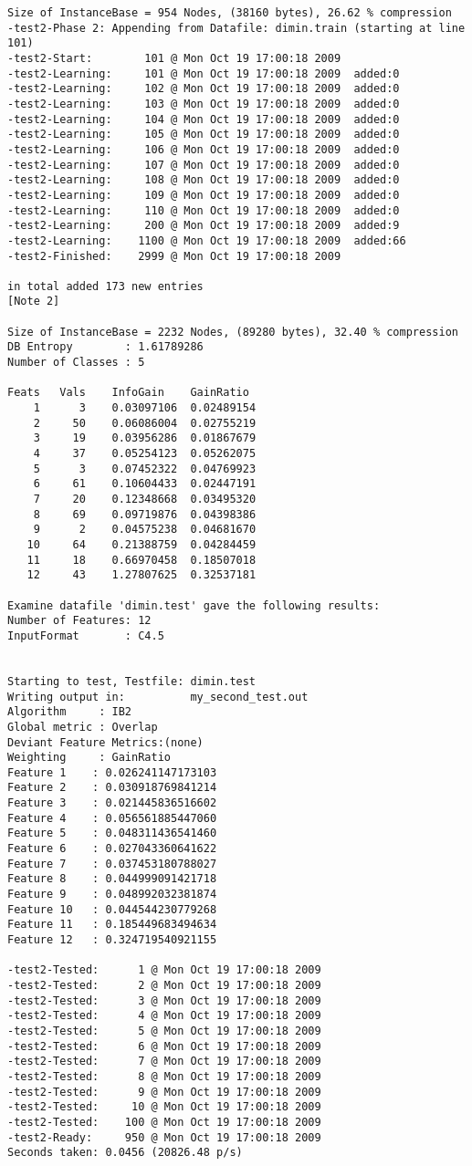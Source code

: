 \documentclass{report}
\begin{document}
\begin{footnotesize}
\begin{verbatim}
Size of InstanceBase = 954 Nodes, (38160 bytes), 26.62 % compression
-test2-Phase 2: Appending from Datafile: dimin.train (starting at line 101)
-test2-Start:        101 @ Mon Oct 19 17:00:18 2009
-test2-Learning:     101 @ Mon Oct 19 17:00:18 2009	 added:0
-test2-Learning:     102 @ Mon Oct 19 17:00:18 2009	 added:0
-test2-Learning:     103 @ Mon Oct 19 17:00:18 2009	 added:0
-test2-Learning:     104 @ Mon Oct 19 17:00:18 2009	 added:0
-test2-Learning:     105 @ Mon Oct 19 17:00:18 2009	 added:0
-test2-Learning:     106 @ Mon Oct 19 17:00:18 2009	 added:0
-test2-Learning:     107 @ Mon Oct 19 17:00:18 2009	 added:0
-test2-Learning:     108 @ Mon Oct 19 17:00:18 2009	 added:0
-test2-Learning:     109 @ Mon Oct 19 17:00:18 2009	 added:0
-test2-Learning:     110 @ Mon Oct 19 17:00:18 2009	 added:0
-test2-Learning:     200 @ Mon Oct 19 17:00:18 2009	 added:9
-test2-Learning:    1100 @ Mon Oct 19 17:00:18 2009	 added:66
-test2-Finished:    2999 @ Mon Oct 19 17:00:18 2009

in total added 173 new entries                                      [Note 2]

Size of InstanceBase = 2232 Nodes, (89280 bytes), 32.40 % compression
DB Entropy        : 1.61789286
Number of Classes : 5

Feats	Vals	InfoGain	GainRatio
    1      3	0.03097106	0.02489154
    2     50	0.06086004	0.02755219
    3     19	0.03956286	0.01867679
    4     37	0.05254123	0.05262075
    5      3	0.07452322	0.04769923
    6     61	0.10604433	0.02447191
    7     20	0.12348668	0.03495320
    8     69	0.09719876	0.04398386
    9      2	0.04575238	0.04681670
   10     64	0.21388759	0.04284459
   11     18	0.66970458	0.18507018
   12     43	1.27807625	0.32537181

Examine datafile 'dimin.test' gave the following results:
Number of Features: 12
InputFormat       : C4.5


Starting to test, Testfile: dimin.test
Writing output in:          my_second_test.out
Algorithm     : IB2
Global metric : Overlap
Deviant Feature Metrics:(none)
Weighting     : GainRatio
Feature 1	 : 0.026241147173103
Feature 2	 : 0.030918769841214
Feature 3	 : 0.021445836516602
Feature 4	 : 0.056561885447060
Feature 5	 : 0.048311436541460
Feature 6	 : 0.027043360641622
Feature 7	 : 0.037453180788027
Feature 8	 : 0.044999091421718
Feature 9	 : 0.048992032381874
Feature 10	 : 0.044544230779268
Feature 11	 : 0.185449683494634
Feature 12	 : 0.324719540921155

-test2-Tested:      1 @ Mon Oct 19 17:00:18 2009
-test2-Tested:      2 @ Mon Oct 19 17:00:18 2009
-test2-Tested:      3 @ Mon Oct 19 17:00:18 2009
-test2-Tested:      4 @ Mon Oct 19 17:00:18 2009
-test2-Tested:      5 @ Mon Oct 19 17:00:18 2009
-test2-Tested:      6 @ Mon Oct 19 17:00:18 2009
-test2-Tested:      7 @ Mon Oct 19 17:00:18 2009
-test2-Tested:      8 @ Mon Oct 19 17:00:18 2009
-test2-Tested:      9 @ Mon Oct 19 17:00:18 2009
-test2-Tested:     10 @ Mon Oct 19 17:00:18 2009
-test2-Tested:    100 @ Mon Oct 19 17:00:18 2009
-test2-Ready:     950 @ Mon Oct 19 17:00:18 2009
Seconds taken: 0.0456 (20826.48 p/s)


\end{verbatim}
\end{footnotesize}
\end{document}
